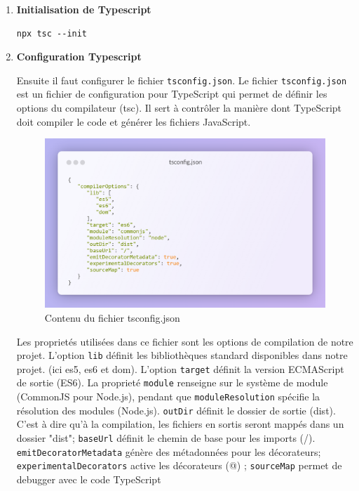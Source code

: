 {\begin{enumerate}
    \begin{verbatim}
npm install typescript ts-node @types/node dotenv
npm install  pg typeorm reflect-metadata 
npm install --save-dev @types/pg nodemon
npm install --save-dev jest ts-jest supertest
npm install --save-dev @types/supertest @types/jest
    \end{verbatim}
   
    Ceci permet d'installer les dépendances essentielles du projet et leurs types.
    \vspace{0.35cm}
    \item \textbf{Initialisation de Typescript}
    \begin{verbatim}
npx tsc --init
    \end{verbatim}

    \item \textbf{Configuration Typescript} 
    
    Ensuite il faut configurer le fichier \verb|tsconfig.json|. Le fichier \verb|tsconfig.json| est un fichier de configuration pour TypeScript qui permet de définir les options du compilateur (tsc). Il sert à contrôler la manière dont TypeScript doit compiler le code et générer les fichiers JavaScript.

    \begin{figure}[H]
    \begin{center}
    \includegraphics[width=15cm]{assets/presentation/tsjson.png}
    \end{center}
    \caption{Contenu du fichier tsconfig.json}
    \end{figure}

    Les proprietés utilisées dans ce fichier sont les options de compilation de notre projet. L'option \verb|lib| définit les bibliothèques standard disponibles dans notre projet.  (ici es5, es6 et dom). L'option \verb|target| définit la version ECMAScript de sortie (ES6).  La proprieté \verb|module| renseigne sur le système de module (CommonJS pour Node.js), pendant que \verb|moduleResolution| spécifie la résolution des modules (Node.js). \verb|outDir| définit le dossier de sortie (dist). C'est à dire qu'à la compilation, les fichiers en sortis seront mappés dans un dossier "dist"; \verb|baseUrl| définit le chemin de base pour les imports (/). \verb|emitDecoratorMetadata| génère des métadonnées pour les décorateurs; \verb|experimentalDecorators| active les décorateurs (@) ; \verb|sourceMap| permet de debugger avec le code TypeScript


\end{enumerate}}
